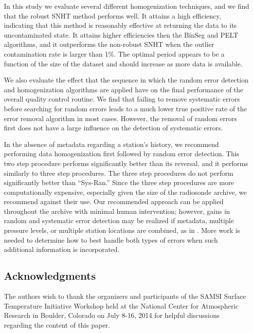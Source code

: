\documentclass[12pt]{article}
\begin{document}
\begin{doublespacing}
In this study we evaluate several different homogenization techniques, and we find that the robust SNHT method performs well.  It attains a high efficiency, indicating that this method is reasonably effective at returning the data to its uncontaminated state.  It attains higher efficiencies then the BinSeg and PELT algorithms, and it outperforms the non-robust SNHT when the outlier contamination rate is larger than 1\%.  The optimal period appears to be a function of the size of the dataset and should increase as more data is available.

We also evaluate the effect that the sequence in which the random error detection and homogenization algorithms are applied have on the final performance of the overall quality control routine.  We find that failing to remove systematic errors before searching for random errors leads to a much lower true positive rate of the error removal algorithm in most cases.  However,  the removal of random errors first does not have a large influence on the detection of systematic errors.

In the absence of metadata regarding a station's history, we recommend performing data homogenization first followed by random error detection.  This two step procedure performs significantly better than its reversal, and it performs similarly to three step procedures.  The three step procedures do not perform significantly better than ``Sys-Ran.''  Since the three step procedures are more computationally expensive, especially given the size of the radiosonde archive, we recommend against their use.  Our recommended approach can be applied throughout the archive with minimal human intervention;   however, gains in random and systematic error detection may be realized if metadata, multiple pressure levels, or multiple station locations are combined, as in \cite{ignaccolo14}.  More work is needed to determine how to best handle both types of errors  when such additional information is incorporated.   

\subsection*{Acknowledgments} The authors wish to thank the organizers and participants of the SAMSI Surface Temperature Initiative Workshop held at the National Center for Atmospheric Research in Boulder, Colorado on July 8-16, 2014 for helpful discussions regarding the content of this paper.

\end{doublespacing}
\end{document}
